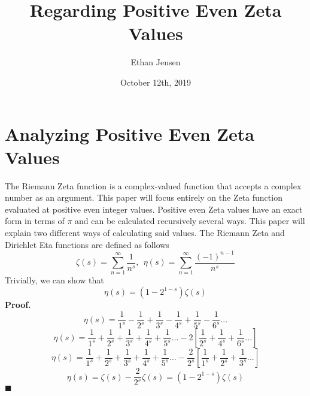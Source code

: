\documentclass[12pt]{article}
\title{Regarding Positive Even Zeta Values}
\author{Ethan Jensen}
\date{October 12th, 2019}
\begin{document}
	\maketitle
	\tikzset{
		node distance=3cm, %
		initial text=$ $, %
	}
\section[20pt]{Analyzing Positive Even Zeta Values}
The Riemann Zeta function is a complex-valued function that accepts a complex number as an argument. This paper will focus entirely on the Zeta function evaluated at positive even integer values. Positive even Zeta values have an exact form in terms of \(\pi\) and can be calculated recursively several ways. This paper will explain two different ways of calculating said values. \newline \newline
The Riemann Zeta and Dirichlet Eta functions are defined as follows
\[\zeta(s)=\sum_{n=1}^{\infty}\frac{1}{n^s},\ \  \eta(s)=\sum_{n=1}^{\infty}\frac{(-1)^{n-1}}{n^s}\]
Trivially, we can show that \[\eta(s)=(1-2^{1-s})\zeta(s)\]
\textbf{Proof.}
\[\eta(s) = \frac{1}{1^s} - \frac{1}{2^s} + \frac{1}{3^s} - \frac{1}{4^s} + \frac{1}{5^s} - \frac{1}{6^s}...\]
\[\eta(s) = \frac{1}{1^s} + \frac{1}{2^s} + \frac{1}{3^s} + \frac{1}{4^s} + \frac{1}{5^s}...-2\left[\frac{1}{2^s} + \frac{1}{4^s} + \frac{1}{6^s}...\right]\]
\[\eta(s) = \frac{1}{1^s} + \frac{1}{2^s} + \frac{1}{3^s} + \frac{1}{4^s} + \frac{1}{5^s}...-\frac{2}{2^s}\left[\frac{1}{1^s} + \frac{1}{2^s} + \frac{1}{3^s}...\right]\]
\[\eta(s)=\zeta(s)-\frac{2}{2^s}\zeta(s)=(1-2^{1-s})\zeta(s)\]
\(\blacksquare\) \newline
\newpage
\end{document}
